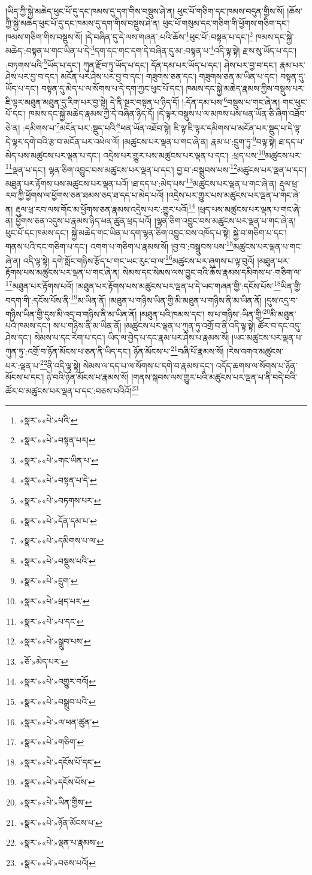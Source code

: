 །ཡིད་ཀྱི་སྐྱེ་མཆེད་ཕུང་པོ་དུ་དང་ཁམས་དུ་དག་གིས་བསྡུས་ཤེ་ན། ཕུང་པོ་གཅིག་དང་ཁམས་བདུན་གྱིས་སོ། །ཆོས་ཀྱི་སྐྱེ་མཆེད་ཕུང་པོ་དུ་དང་ཁམས་དུ་དག་གིས་བསྡུས་ཤེ་ན། ཕུང་པོ་གསུམ་དང་གཅིག་གི་ཕྱོགས་གཅིག་དང་། ཁམས་གཅིག་གིས་བསྡུས་སོ། །དེ་བཞིན་དུ་དེ་ལས་གཞན་:པའི་ཆོས་\footnote{«སྣར་»«པེ་»པའི་}ཕུང་པོ་:བསྟན་པ་དང་།\footnote{«སྣར་»«པེ་»བསྟན་པར།} ཁམས་དང་སྐྱེ་མཆེད་:བསྟན་པ་གང་ཡིན་པ་དེ་\footnote{«སྣར་»«པེ་»གང་ཡིན་པ་}དག་དང་གང་དག་དེ་བཞིན་དུ་མ་:བསྟན་པ་\footnote{«སྣར་»«པེ་»བསྟན་པ་དེ་}འདི་ལྟ་སྟེ། རྫས་སུ་ཡོད་པ་དང་། :བཏགས་པའི་\footnote{«སྣར་»«པེ་»བཏགས་པར་}ཡོད་པ་དང་། ཀུན་རྫོབ་ཏུ་ཡོད་པ་དང་། དོན་དམ་པར་ཡོད་པ་དང་། ཤེས་པར་བྱ་བ་དང་། རྣམ་པར་ཤེས་པར་བྱ་བ་དང་། མངོན་པར་ཤེས་པར་བྱ་བ་དང་། གཟུགས་ཅན་དང་། གཟུགས་ཅན་མ་ཡིན་པ་དང་། བསྟན་དུ་ཡོད་པ་དང་། བསྟན་དུ་མེད་པ་ལ་སོགས་པ་དེ་དག་ཀྱང་ཕུང་པོ་དང་། ཁམས་དང་སྐྱེ་མཆེད་རྣམས་ཀྱིས་བསྡུས་པར་ཇི་ལྟར་མཐུན་མཐུན་དུ་རིག་པར་བྱ་སྟེ། དེ་ནི་སྔར་བསྟན་པ་ཉིད་དོ། །:དོན་དམ་པས་\footnote{«སྣར་»«པེ་»དོན་དམ་པ་}བསྡུས་པ་གང་ཞེ་ན། གང་ཕུང་པོ་དང་། ཁམས་དང་སྐྱེ་མཆེད་རྣམས་ཀྱི་དེ་བཞིན་ཉིད་དོ། །དེ་ལྟར་བསྡུས་པ་ལ་མཁས་པས་ཕན་ཡོན་ཅི་ཞིག་འཐོབ་ཅེ་ན། :དམིགས་པ་\footnote{«སྣར་»«པེ་»དམིགས་པ་ལ་}མངོན་པར་:སྡུད་པའི་\footnote{«སྣར་»«པེ་»བསྡུས་པའི་}ཕན་ཡོན་འཐོབ་སྟེ། ཇི་ལྟ་ཇི་ལྟར་དམིགས་པ་མངོན་པར་སྡུད་པ་དེ་ལྟ་དེ་ལྟར་དགེ་བའི་རྩ་བ་མངོན་པར་འཕེལ་ལོ། །མཚུངས་པར་ལྡན་པ་གང་ཞེ་ན། རྣམ་པ་:དྲུག་ཏུ་\footnote{«སྣར་»«པེ་»དྲུག་}བལྟ་སྟེ། ཐ་དད་པ་མེད་པས་མཚུངས་པར་ལྡན་པ་དང་། འདྲེས་པར་གྱུར་པས་མཚུངས་པར་ལྡན་པ་དང་། :ཕྲད་པས་\footnote{«སྣར་»«པེ་»ཕྲད་པར་}མཚུངས་པར་\footnote{«སྣར་»«པེ་»པ་དང་}ལྡན་པ་དང་། ལྷན་ཅིག་འབྱུང་བས་མཚུངས་པར་ལྡན་པ་དང་། བྱ་བ་:བསྒྲུབས་པས་\footnote{«སྣར་»«པེ་»སྒྲུབ་པས་}མཚུངས་པར་ལྡན་པ་དང་། མཐུན་པར་རྟོགས་པས་མཚུངས་པར་ལྡན་པའོ། །ཐ་དད་པ་:མེད་པས་\footnote{«ཅོ་»མེད་པར་}མཚུངས་པར་ལྡན་པ་གང་ཞེ་ན། རྡུལ་ཕྲ་རབ་ཀྱི་ཕྱོགས་ལ་ཕྱོགས་ཅན་ཐམས་ཅད་ཐ་དད་པ་མེད་པའོ། །འདྲེས་པར་གྱུར་པས་མཚུངས་པར་ལྡན་པ་གང་ཞེ་ན། རྡུལ་ཕྲ་རབ་ལས་གོང་མ་ཕྱོགས་ཅན་རྣམས་འདྲེས་པར་:གྱུར་པའོ།\footnote{«སྣར་»«པེ་»འགྱུར་བའོ།} །ཕྲད་པས་མཚུངས་པར་ལྡན་པ་གང་ཞེ་ན། ཕྱོགས་ཅན་འདུས་པ་རྣམས་ཉིད་ཕན་ཚུན་ཕྲད་པའོ། །ལྷན་ཅིག་འབྱུང་བས་མཚུངས་པར་ལྡན་པ་གང་ཞེ་ན། ཕུང་པོ་དང་ཁམས་དང་། སྐྱེ་མཆེད་གང་ཡིན་པ་དག་ལྷན་ཅིག་འབྱུང་བས་འཁོད་པ་སྟེ། སྐྱེ་བ་གཅིག་པ་དང་། གནས་པའི་དང་གཅིག་པ་དང་། འགག་པ་གཅིག་པ་རྣམས་སོ། །བྱ་བ་:བསྒྲུབས་པས་\footnote{«སྣར་»«པེ་»བསྒྲུབ་པའི་}མཚུངས་པར་ལྡན་པ་གང་ཞེ་ན། འདི་ལྟ་སྟེ། དགེ་སློང་གཉིས་རྩོད་པ་གང་ཡང་རུང་བ་ལ་\footnote{«སྣར་»«པེ་»ལ་ཕན་ཚུན་}མཚུངས་པར་ཞུགས་པ་ལྟ་བུའོ། །མཐུན་པར་རྟོགས་པས་མཚུངས་པར་ལྡན་པ་གང་ཞེ་ན། སེམས་དང་སེམས་ལས་བྱུང་བའི་ཆོས་རྣམས་དམིགས་པ་:གཅིག་ལ་\footnote{«སྣར་»«པེ་»གཅིག་}མཐུན་པར་རྟོགས་པའོ། །མཐུན་པར་རྟོགས་པས་མཚུངས་པར་ལྡན་པ་དེ་ཡང་གཞན་གྱི་:དངོས་པོས་\footnote{«སྣར་»«པེ་»དངོས་པོ་དང་}ཡིན་གྱི་བདག་གི་:དངོས་པོས་ནི་\footnote{«སྣར་»«པེ་»དངོས་པོས་}མ་ཡིན་ནོ། །མཐུན་པ་གཉིས་ཡིན་གྱི་མི་མཐུན་པ་གཉིས་ནི་མ་ཡིན་ནོ། །དུས་འདྲ་བ་གཉིས་ཡིན་གྱི་དུས་མི་འདྲ་བ་གཉིས་ནི་མ་ཡིན་ནོ། །མཐུན་པའི་ཁམས་དང་། ས་པ་གཉིས་:ཡིན་གྱི་\footnote{«སྣར་»«པེ་»ཡིན་གྱིས་}མི་མཐུན་པའི་ཁམས་དང་། ས་པ་གཉིས་ནི་མ་ཡིན་ནོ། །མཚུངས་པར་ལྡན་པ་ཀུན་ཏུ་འགྲོ་བ་ནི་འདི་ལྟ་སྟེ། ཚོར་བ་དང་འདུ་ཤེས་དང་། སེམས་པ་དང་རེག་པ་དང་། ཡིད་ལ་བྱེད་པ་དང་རྣམ་པར་ཤེས་པ་རྣམས་སོ། །ཡང་མཚུངས་པར་ལྡན་པ་ཀུན་ཏུ་:འགྲོ་བ་ཉོན་མོངས་པ་ཅན་ནི་ཡིད་དང་། ཉོན་མོངས་པ་\footnote{«སྣར་»«པེ་»ཉོན་མོངས་པ་}བཞི་པོ་རྣམས་སོ། །རེས་འགའ་མཚུངས་པར་:ལྡན་པ་\footnote{«སྣར་»«པེ་»ལྡན་པ་རྣམས་}ནི་འདི་ལྟ་སྟེ། སེམས་ལ་དད་པ་ལ་སོགས་པ་དགེ་བ་རྣམས་དང་། འདོད་ཆགས་ལ་སོགས་པ་ཉོན་མོངས་པ་དང་། ཉེ་བའི་ཉོན་མོངས་པ་རྣམས་སོ། །གནས་སྐབས་ལས་གྱུར་པའི་མཚུངས་པར་ལྡན་པ་ནི་བདེ་བའི་ཚོར་བ་མཚུངས་པར་ལྡན་པ་དང་:བཅས་པའིའོ།\footnote{«སྣར་»«པེ་»བཅས་པའོ།} 